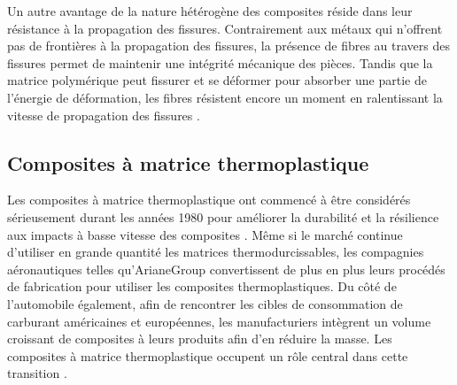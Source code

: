 Un autre avantage de la nature hétérogène des composites réside dans leur résistance à la propagation des fissures. 
Contrairement aux métaux qui n'offrent pas de frontières à la propagation des fissures, la présence de fibres au travers des fissures permet de maintenir une intégrité mécanique des pièces. 
Tandis que la matrice polymérique peut fissurer et se déformer pour absorber une partie de l'énergie de déformation, les fibres résistent encore un moment en ralentissant la vitesse de propagation des fissures \cite{Hull2001}. 

\subsection{Composites à matrice thermoplastique}

Les composites à matrice thermoplastique ont commencé à être considérés sérieusement durant les années 1980 pour améliorer la durabilité et la résilience aux impacts à basse vitesse des composites \cite{asmhandbook21}. 
Même si le marché continue d'utiliser en grande quantité les matrices thermodurcissables, les compagnies aéronautiques telles qu'ArianeGroup convertissent de plus en plus leurs procédés de fabrication pour utiliser les composites thermoplastiques. 
Du côté de l'automobile également, afin de rencontrer les cibles de consommation de carburant américaines et européennes, les manufacturiers intègrent un volume croissant de composites à leurs produits afin d'en réduire la masse. 
Les composites à matrice thermoplastique occupent un rôle central dans cette transition \cite{CompositesWorld2019_market2020}. 

